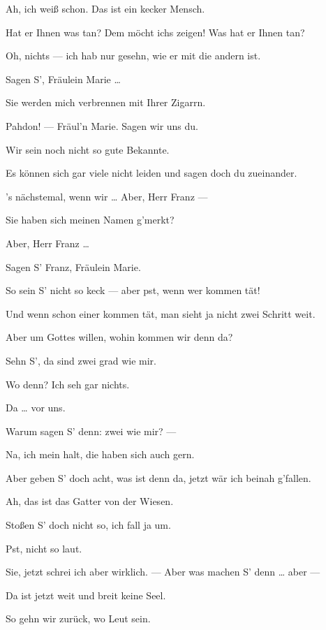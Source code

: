 \documentclass[
	final,
	a4paper,
	ngerman,
	mpinclude = true, %
	twoside = true,
	open = right,
	cleardoublepage = plain,
	DIV = 13,
	BCOR = 1cm,
	titlepage = firstiscover,
	]{scrbook}
\newcommand{\thecharacter}[1]{\textup{\textsc{#1}}}
\newcommand{\thesoldat}{\thecharacter{Soldat}}
\newcommand{\themaedchen}{\thecharacter{Stubenmädchen}}
\newcommand{\character}[1]{\item[#1:]}
\newcommand{\soldat}{\character{\thesoldat}}
\newcommand{\maedchen}{\character{\themaedchen}}
\begin{document}
\begin{play}
	\maedchen
	Ah, ich weiß schon. Das ist ein kecker Mensch.

	\soldat
	Hat er Ihnen was tan? Dem möcht ichs zeigen! Was hat er Ihnen tan?

	\maedchen
	Oh, nichts --- ich hab nur gesehn, wie er mit die andern ist.

	\soldat
	Sagen S', Fräulein Marie \ldots{}

	\maedchen
	Sie werden mich verbrennen mit Ihrer Zigarrn.

	\soldat
	Pahdon! --- Fräul'n Marie. Sagen wir uns du.

	\maedchen
	Wir sein noch nicht so gute Bekannte.

	\soldat
	Es können sich gar viele nicht leiden und sagen doch du zueinander.

	\maedchen
	's nächstemal, wenn wir \ldots{} Aber, Herr Franz ---

	\soldat
	Sie haben sich meinen Namen g'merkt?

	\maedchen
	Aber, Herr Franz \ldots{}

	\soldat
	Sagen S' Franz, Fräulein Marie.

	\maedchen
	So sein S' nicht so keck --- aber pst, wenn wer kommen tät!

	\soldat
	Und wenn schon einer kommen tät, man sieht ja nicht zwei Schritt weit.

	\maedchen
	Aber um Gottes willen, wohin kommen wir denn da?

	\soldat
	Sehn S', da sind zwei grad wie mir.

	\maedchen
	Wo denn? Ich seh gar nichts.

	\soldat
	Da \ldots{} vor uns.

	\maedchen
	Warum sagen S' denn: zwei wie mir? ---

	\soldat
	Na, ich mein halt, die haben sich auch gern.

	\maedchen
	Aber geben S' doch acht, was ist denn da, jetzt wär ich beinah g'fallen.

	\soldat
	Ah, das ist das Gatter von der Wiesen.

	\maedchen
	Stoßen S' doch nicht so, ich fall ja um.

	\soldat
	Pst, nicht so laut.

	\maedchen
	Sie, jetzt schrei ich aber wirklich. --- Aber was machen S' denn \ldots{} aber ---

	\soldat
	Da ist jetzt weit und breit keine Seel.

	\maedchen
	So gehn wir zurück, wo Leut sein.


\end{play}
\end{document}

